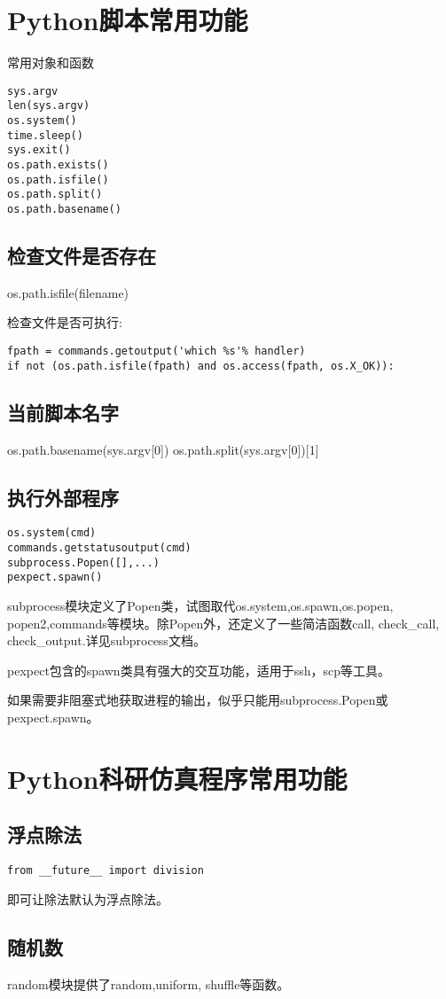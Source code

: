 \section{Python脚本常用功能}
常用对象和函数
\begin{verbatim}
sys.argv
len(sys.argv)
os.system()
time.sleep()
sys.exit()
os.path.exists()
os.path.isfile()
os.path.split()
os.path.basename()
\end{verbatim}

\subsection{检查文件是否存在}
os.path.isfile(filename)

检查文件是否可执行:
\begin{verbatim}
fpath = commands.getoutput('which %s'% handler)
if not (os.path.isfile(fpath) and os.access(fpath, os.X_OK)):
\end{verbatim}
\subsection{当前脚本名字}
os.path.basename(sys.argv[0])
os.path.split(sys.argv[0])[1]
\subsection{执行外部程序}
\begin{verbatim}
os.system(cmd)
commands.getstatusoutput(cmd)
subprocess.Popen([],...)
pexpect.spawn()
\end{verbatim}
subprocess模块定义了Popen类，试图取代os.system,os.spawn,os.popen, popen2,commands等模块。除Popen外，还定义了一些简洁函数call, check\_call, check\_output.详见subprocess文档。

pexpect包含的spawn类具有强大的交互功能，适用于ssh，scp等工具。

如果需要非阻塞式地获取进程的输出，似乎只能用subprocess.Popen或pexpect.spawn。

\section{Python科研仿真程序常用功能}

\subsection{浮点除法}
\begin{lstlisting}
from __future__ import division
\end{lstlisting}
即可让除法默认为浮点除法。
\subsection{随机数}
random模块提供了random,uniform, shuffle等函数。
















